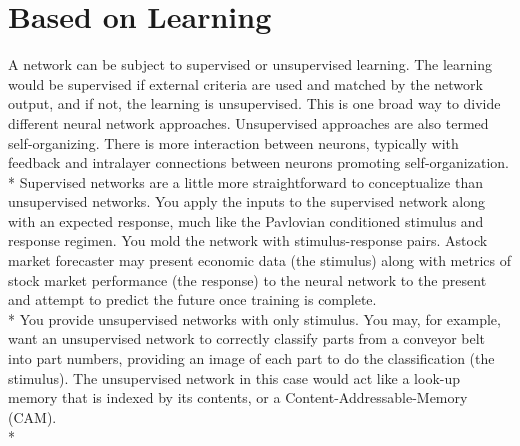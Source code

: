 \documentclass{wileysev}
\begin{document}



\titlepage

\chapter{Based on Learning}



A network can be subject to supervised or unsupervised learning. The learning would be supervised if external criteria are used and matched by the network output, and if not, the learning is unsupervised. This is one broad way to divide different neural network approaches. Unsupervised approaches are also termed self-organizing. There is more interaction between neurons, typically with feedback and intralayer connections between neurons promoting self-organization. \\*
Supervised networks are a little more straightforward to conceptualize than unsupervised networks. You apply the inputs to the supervised network along with an expected response, much like the Pavlovian conditioned stimulus and response regimen. You mold the network with stimulus-response pairs. Astock market forecaster may present economic data (the stimulus) along with metrics of stock market performance (the response) to the neural network to the present and attempt to predict the future once training is complete. \\*
\tab You provide unsupervised networks with only stimulus. You may, for example, want an unsupervised network to correctly classify parts from a conveyor belt into part numbers, providing an image of each part to do the classification (the stimulus). The unsupervised network in this case would act like a look-up memory that is indexed by its contents, or a Content-Addressable-Memory (CAM). \\*
\end{document}
